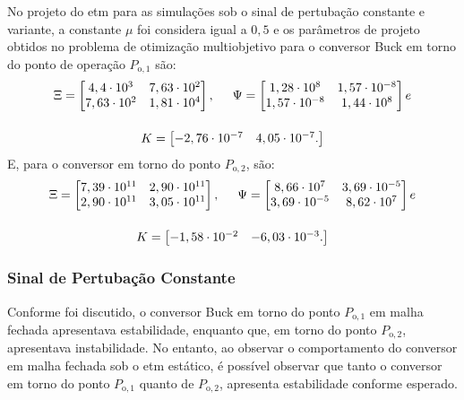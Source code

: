 No projeto do \acrshort{etm} para as simulações sob o sinal de pertubação constante e variante, a constante $\mu$ foi considera igual a $0,5$ e os parâmetros de projeto obtidos no problema de otimização multiobjetivo para o conversor Buck em torno do ponto de operação $P_{\mathrm{o}, 1}$ são: \begin{gather}
  \Xi = \begin{bmatrix}
    4,4 \cdot 10^3  & 7,63 \cdot 10^2 \\
    7,63 \cdot 10^2 & 1,81 \cdot 10^4 \\
  \end{bmatrix}, \hspace{.5cm}
  \Psi = \begin{bmatrix}
    1,28 \cdot 10^8    & 1,57 \cdot 10^{-8} \\
    1,57 \cdot 10^{-8} & 1,44 \cdot 10^8    \\
  \end{bmatrix} e \notag \\[12pt]
  K = \begin{bmatrix}
    -2,76 \cdot 10^{-7} & 4,05 \cdot 10^{-7}. \notag
  \end{bmatrix}
\end{gather} E, para o conversor em torno do ponto $P_{\mathrm{o}, 2}$, são: \begin{gather}
  \Xi = \begin{bmatrix}
    7,39 \cdot 10^{11} & 2,90 \cdot 10^{11} \\
    2,90 \cdot 10^{11} & 3,05 \cdot 10^{11} \\
  \end{bmatrix}, \hspace{.5cm}
  \Psi = \begin{bmatrix}
    8,66 \cdot 10^7    & 3,69 \cdot 10^{-5} \\
    3,69 \cdot 10^{-5} & 8,62 \cdot 10^7    \\
  \end{bmatrix} e \notag \\[12pt]
  K = \begin{bmatrix}
    -1,58 \cdot 10^{-2} & -6,03 \cdot 10^{-3}. \notag
  \end{bmatrix}
\end{gather}


\subsubsection{Sinal de Pertubação Constante}

Conforme foi discutido, o conversor Buck em torno do ponto $P_{\mathrm{o}, 1}$ em malha fechada apresentava estabilidade, enquanto que, em torno do ponto $P_{\mathrm{o}, 2}$, apresentava instabilidade. No entanto, ao observar o comportamento do conversor em malha fechada sob o \acrshort{etm} estático, é possível observar que tanto o conversor em torno do ponto $P_{\mathrm{o}, 1}$ quanto de $P_{\mathrm{o}, 2}$, apresenta estabilidade conforme esperado.

